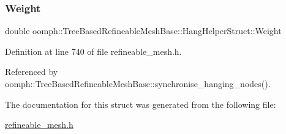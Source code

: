 \subsubsection{\texorpdfstring{Weight}{Weight}}
{\footnotesize\ttfamily double oomph\+::\+Tree\+Based\+Refineable\+Mesh\+Base\+::\+Hang\+Helper\+Struct\+::\+Weight}



Definition at line 740 of file refineable\+\_\+mesh.\+h.



Referenced by oomph\+::\+Tree\+Based\+Refineable\+Mesh\+Base\+::synchronise\+\_\+hanging\+\_\+nodes().



The documentation for this struct was generated from the following file\+:\begin{DoxyCompactItemize}
\item 
\hyperlink{refineable__mesh_8h}{refineable\+\_\+mesh.\+h}\end{DoxyCompactItemize}
